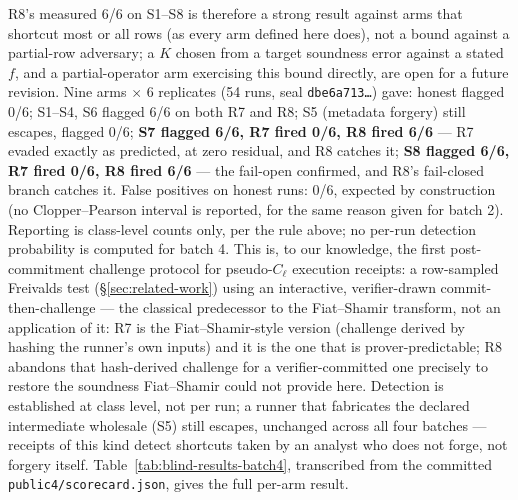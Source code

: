 \documentclass[11pt]{article}
\begin{document}
R8's measured 6/6 on S1--S8 is therefore a strong result against arms that
shortcut most or all rows (as every arm defined here does), not a bound
against a partial-row adversary; a \(K\) chosen from a target soundness
error against a stated \(f\), and a partial-operator arm exercising this
bound directly, are open for a future revision. Nine arms \(\times\) 6 replicates (54 runs, seal
\texttt{dbe6a713\ldots}) gave: honest flagged 0/6; S1--S4, S6 flagged 6/6 on both R7 and R8;
S5 (metadata forgery) still escapes, flagged 0/6; \textbf{S7 flagged 6/6, R7 fired
0/6, R8 fired 6/6} --- R7 evaded exactly as predicted, at zero residual,
and R8 catches it; \textbf{S8 flagged 6/6, R7 fired 0/6, R8 fired 6/6} ---
the fail-open confirmed, and R8's fail-closed branch catches it. False
positives on honest runs: 0/6, expected by construction (no Clopper--Pearson
interval is reported, for the same reason given for batch 2). Reporting is class-level counts only, per
the rule above; no per-run detection probability is computed for batch 4.
This is, to our knowledge, the first post-commitment challenge protocol for
pseudo-\(C_\ell\) execution receipts: a row-sampled Freivalds test
(\S\ref{sec:related-work}) using an interactive, verifier-drawn
commit-then-challenge --- the classical predecessor to the Fiat--Shamir
transform, not an application of it: R7 is the Fiat--Shamir-style version
(challenge derived by hashing the runner's own inputs) and it is the one
that is prover-predictable; R8 abandons that hash-derived challenge for a
verifier-committed one precisely to restore the soundness Fiat--Shamir
could not provide here. Detection is
established at class level, not per run; a runner that fabricates the
declared intermediate wholesale (S5) still escapes, unchanged across all
four batches --- receipts of this kind detect shortcuts taken by an analyst
who does not forge, not forgery itself. Table~\ref{tab:blind-results-batch4},
transcribed from the committed \texttt{public4/scorecard.json}, gives the
full per-arm result.
\end{document}
